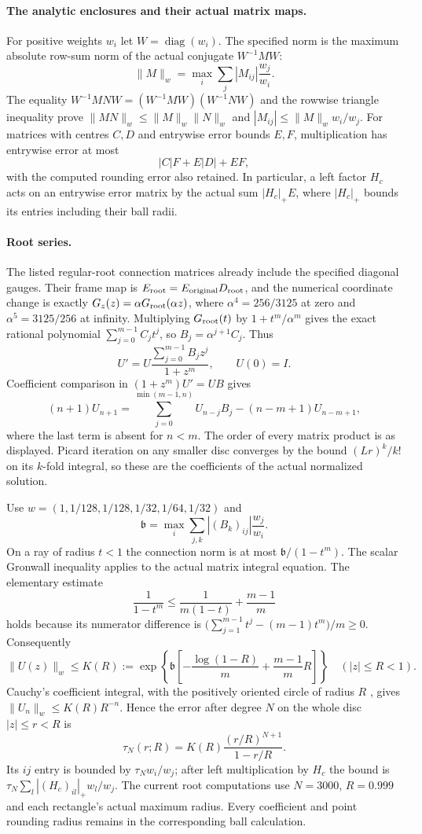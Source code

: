\paragraph{The analytic enclosures and their actual matrix maps.}
For positive weights $w_i$ let $W=\operatorname{diag}(w_i)$. The
specified norm is the maximum absolute row-sum norm of the actual
conjugate $W^{-1}MW$:
\[
 \|M\|_w=\max_i\sum_j|M_{ij}|\frac{w_j}{w_i}.
\]
The equality $W^{-1}MNW=(W^{-1}MW)(W^{-1}NW)$ and the rowwise
triangle inequality prove
$\|MN\|_w\le\|M\|_w\|N\|_w$ and
$|M_{ij}|\le\|M\|_w w_i/w_j$. For matrices with centres $C,D$
and entrywise error bounds $E,F$, multiplication has entrywise
error at most
\[
 |C|F+E|D|+EF,
\]
with the computed rounding error also retained. In particular, a
left factor $H_c$ acts on an entrywise error matrix by the actual
sum $|H_c|_+E$, where $|H_c|_+$ bounds its entries including their
ball radii.

\paragraph{Root series.}
The listed regular-root connection matrices already include the
specified diagonal gauges. Their frame map is
$E_{\rm root}=E_{\rm original}D_{\rm root}$, and the numerical
coordinate change is exactly
$G_z(z)=\alpha G_{\rm root}(\alpha z)$, where
$\alpha^4=256/3125$ at zero and $\alpha^5=3125/256$ at infinity.
Multiplying $G_{\rm root}(t)$ by $1+t^m/\alpha^m$ gives the exact
rational polynomial $\sum_{j=0}^{m-1}C_jt^j$, so
$B_j=\alpha^{j+1}C_j$. Thus
\[
 U'=U\frac{\sum_{j=0}^{m-1}B_jz^j}{1+z^m},\qquad U(0)=I.
\]
Coefficient comparison in $(1+z^m)U'=UB$ gives
\[
 (n+1)U_{n+1}
 =\sum_{j=0}^{\min(m-1,n)}U_{n-j}B_j
   -(n-m+1)U_{n-m+1},
\]
where the last term is absent for $n<m$. The order of every
matrix product is as displayed. Picard iteration on any smaller
disc converges by the bound $(Lr)^k/k!$ on its $k$-fold integral,
so these are the coefficients of the actual normalized solution.

Use $w=(1,1/128,1/128,1/32,1/64,1/32)$ and
\[
 \mathfrak b=\max_i\sum_{j,k}|(B_k)_{ij}|\frac{w_j}{w_i}.
\]
On a ray of radius $t<1$ the connection norm is at most
$\mathfrak b/(1-t^m)$. The scalar Gronwall inequality
\cite[Lemma~2.7, pp.~42--43]{TeschlODE2012} applies to the actual
matrix integral equation. The elementary estimate
\[
 \frac1{1-t^m}\le\frac1{m(1-t)}+\frac{m-1}{m}
\]
holds because its numerator difference is
$\bigl(\sum_{j=1}^{m-1}t^j-(m-1)t^m\bigr)/m\ge0$.
Consequently
\[
 \|U(z)\|_w\le K(R):=
 \exp\!\left\{\mathfrak b\left[-\frac{\log(1-R)}m
                 +\frac{m-1}{m}R\right]\right\}
 \quad (|z|\le R<1).
\]
Cauchy's coefficient integral, with the positively oriented circle
of radius $R$ \cite[\S1.9(iii), (1.9.30)--(1.9.31)]{DLMFCauchy2026},
gives $\|U_n\|_w\le K(R)R^{-n}$. Hence the error after degree $N$
on the whole disc $|z|\le r<R$ is
\[
 \tau_N(r;R)=K(R)\frac{(r/R)^{N+1}}{1-r/R}.
\]
Its $ij$ entry is bounded by $\tau_Nw_i/w_j$; after left
multiplication by $H_c$ the bound is
$\tau_N\sum_l|(H_c)_{il}|_+w_l/w_j$.
The current root computations use $N=3000$, $R=0.999$ and each
rectangle's actual maximum radius. Every coefficient and point
rounding radius remains in the corresponding ball calculation.


